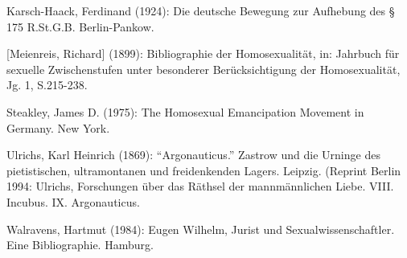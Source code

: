 \documentclass[a4paper,
fontsize=11pt,
oneside,
numbers=noperiodatend,
parskip=half-,
bibliography=totoc,
final
]{scrartcl}
\begin{document}
Karsch-Haack, Ferdinand (1924): Die deutsche Bewegung zur Aufhebung des
§ 175 R.St.G.B. Berlin-Pankow.

{[}Meienreis, Richard{]} (1899): Bibliographie der Homosexualität, in:
Jahrbuch für sexuelle Zwischenstufen unter besonderer Berücksichtigung
der Homosexualität, Jg. 1, S.215-238.

Steakley, James D. (1975): The Homosexual Emancipation Movement in
Germany. New York.

Ulrichs, Karl Heinrich (1869): \enquote{Argonauticus.} Zastrow und die
Urninge des pietistischen, ultramontanen und freidenkenden Lagers.
Leipzig. (Reprint Berlin 1994: Ulrichs, Forschungen über das Räthsel der
mannmännlichen Liebe. VIII. Incubus. IX. Argonauticus.

Walravens, Hartmut (1984): Eugen Wilhelm, Jurist und
Sexualwissenschaftler. Eine Bibliographie. Hamburg.

\end{document}
